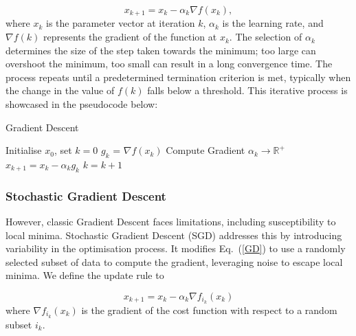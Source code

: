 \documentclass[a4paper]{report}
\begin{document}
\begin{equation}\label{GD}
    x_{k+1} = x_k - \alpha_k \nabla f(x_k),
\end{equation}
where $x_k$ is the parameter vector at iteration $k$, $\alpha_k$ is the learning rate, and $\nabla f(k)$ represents the gradient of the function at $x_k$. The selection of $\alpha_k$ determines the size of the step taken towards the minimum; too large can overshoot the minimum, too small can result in a long convergence time. The process repeats until a predetermined termination criterion is met, typically when the change in the value of $f(k)$ falls below a threshold. This iterative process is showcased in the pseudocode below:

\begin{algorithm}
\caption{Gradient Descent}
\label{algo:gradient_descent}
\begin{algorithmic}[1]
\State Initialise \( x_0 \), set \( k = 0 \)
    \State $g_k$ = \( \nabla f(x_k) \) \Comment Compute Gradient
    \State $\alpha_k \rightarrow \mathbb{R}^+$
    \State $x_{k+1} = x_k - \alpha_k g_k$
    \State \( k = k + 1 \)
\EndWhile
\end{algorithmic}
\end{algorithm}

\subsubsection{Stochastic Gradient Descent}
However, classic Gradient Descent faces limitations, including susceptibility to local minima. Stochastic Gradient Descent (SGD) addresses this by introducing variability in the optimisation process. It modifies Eq.~(\ref{GD}) to use a randomly selected subset of data to compute the gradient, leveraging noise to escape local minima. We define the update rule to 

\begin{equation}\label{SGD}
x_{k+1} = x_k - \alpha_k \nabla f_{i_k}(x_k)	
\end{equation}
where $\nabla f_{i_k}(x_k)$ is the gradient of the cost function with respect to a random subset $i_k$.

\end{document}
